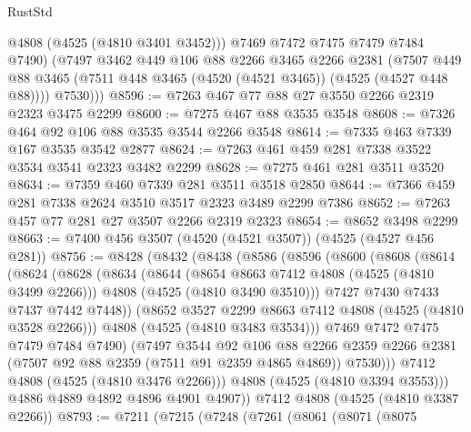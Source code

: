 \begin{lexlean}{RustStd}
\begin{coremodule}
            @4808
            (@4525 (@4810 @3401 @3452)))
          @7469
          @7472
          @7475
          @7479
          @7484
          @7490)
        (@7497
          @3462
          @449
          @106
          @88
          @2266
          @3465
          @2266
          @2381
          (@7507 @449 @88 @3465 (@7511 @448 @3465 (@4520 (@4521 @3465)) (@4525 (@4527 @448 @88))))
          @7530)))
@8596 := @7263 @467 @77 @88 @27 @3550 @2266 @2319 @2323 @3475 @2299
@8600 := @7275 @467 @88 @3535 @3548
@8608 := @7326 @464 @92 @106 @88 @3535 @3544 @2266 @3548
@8614 := @7335 @463 @7339 @167 @3535 @3542 @2877
@8624 := @7263 @461 @459 @281 @7338 @3522 @3534 @3541 @2323 @3482 @2299
@8628 := @7275 @461 @281 @3511 @3520
@8634 := @7359 @460 @7339 @281 @3511 @3518 @2850
@8644 := @7366 @459 @281 @7338 @2624 @3510 @3517 @2323 @3489 @2299 @7386
@8652 := @7263 @457 @77 @281 @27 @3507 @2266 @2319 @2323
@8654 := @8652 @3498 @2299
@8663 := @7400 @456 @3507 (@4520 (@4521 @3507)) (@4525 (@4527 @456 @281))
@8756 := @8428
    (@8432
      (@8438
        (@8586
          (@8596
            (@8600
              (@8608
                (@8614
                  (@8624
                    (@8628
                      (@8634
                        (@8644
                          (@8654 @8663 @7412 @4808 (@4525 (@4810 @3499 @2266)))
                          @4808
                          (@4525 (@4810 @3490 @3510)))
                        @7427
                        @7430
                        @7433
                        @7437
                        @7442
                        @7448))
                    (@8652 @3527 @2299 @8663 @7412 @4808 (@4525 (@4810 @3528 @2266)))
                    @4808
                    (@4525 (@4810 @3483 @3534)))
                  @7469
                  @7472
                  @7475
                  @7479
                  @7484
                  @7490)
                (@7497
                  @3544
                  @92
                  @106
                  @88
                  @2266
                  @2359
                  @2266
                  @2381
                  (@7507 @92 @88 @2359 (@7511 @91 @2359 @4865 @4869))
                  @7530)))
            @7412
            @4808
            (@4525 (@4810 @3476 @2266)))
          @4808
          (@4525 (@4810 @3394 @3553)))
        @4886
        @4889
        @4892
        @4896
        @4901
        @4907))
    @7412
    @4808
    (@4525 (@4810 @3387 @2266))
@8793 := @7211
    (@7215
      (@7248
        (@7261
          (@8061
            (@8071
              (@8075

\end{coremodule}
\end{lexlean}

